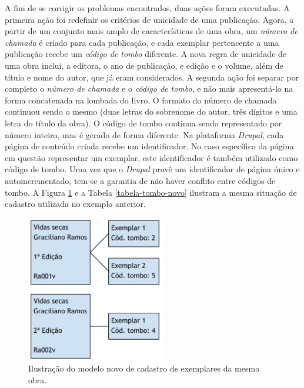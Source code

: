 \documentclass[a4paper]{article}
\begin{document}
A fim de se corrigir os problemas encontrados, duas ações foram executadas. A primeira ação foi redefinir os critérios de unicidade de uma publicação. Agora, a partir de um conjunto mais amplo de características de uma obra, um \textit{número de chamada} é criado para cada publicação, e cada exemplar pertencente a uma publicação recebe um \textit{código de tombo} diferente. A nova regra de unicidade de uma obra inclui, a editora, o ano de publicação, e edição e o volume, além de título e nome do autor, que já eram considerados. A segunda ação foi separar por completo o \textit{número de chamada} e o \textit{código de tombo}, e não mais apresentá-lo na forma concatenada na lombada do livro. O formato do número de chamada continuou sendo o mesmo (duas letras do sobrenome do autor, três dígitos e uma letra do título da obra). O código de tombo continua sendo representado por número inteiro, mas é gerado de forma diferente. Na plataforma \textit{Drupal}, cada página de conteúdo criada recebe um identificador. No caso específico da página em questão representar um exemplar, este identificador é também utilizado como código de tombo. Uma vez que o \textit{Drupal} provê um identificador de página único e autoincrementado, tem-se a garantia de não haver conflito entre códigos de tombo. A Figura \ref{tombo-novo} e a Tabela \ref{tabela-tombo-novo} ilustram a mesma situação de cadastro utilizada no exemplo anterior.

\begin{figure}[pbth!]
\centering
\caption{Ilustração do modelo novo de cadastro de exemplares da mesma obra.\label{tombo-novo}}
\includegraphics[width=60mm]{img/tombo-novo.png}
\end{figure}
\end{document}
